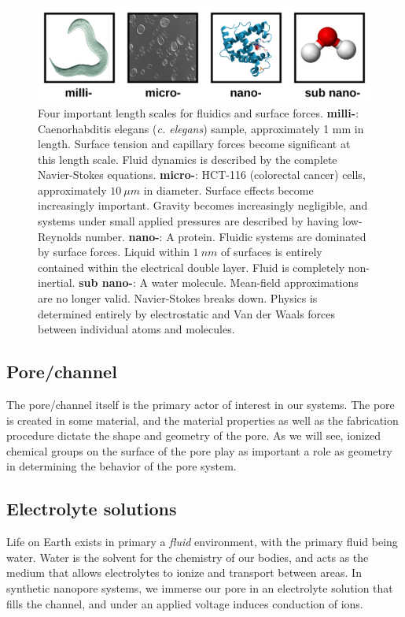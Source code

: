 		\begin{figure}[h]
			\includegraphics[width=\textwidth]{scales.png}
			\caption{Four important length scales for fluidics and surface forces. \textbf{milli-}: Caenorhabditis elegans (\textit{c. elegans}) sample, approximately 1 mm in length. Surface tension and capillary forces become significant at this length scale. Fluid dynamics is described by the complete Navier-Stokes equations. \textbf{micro-}: HCT-116 (colorectal cancer) cells, approximately $\SI{10}{\mu m}$ in diameter. Surface effects become increasingly important. Gravity becomes increasingly negligible, and systems under small applied pressures are described by having low-Reynolds number. \textbf{nano-}: A protein. Fluidic systems are dominated by surface forces. Liquid within $\SI{1}{nm}$ of surfaces is entirely contained within the electrical double layer. Fluid is completely non-inertial. \textbf{sub nano-}: A water molecule. Mean-field approximations are no longer valid. Navier-Stokes breaks down. Physics is determined entirely by electrostatic and Van der Waals forces between individual atoms and molecules.}
		\end{figure}
		
		\subsection{Pore/channel}
		
			The pore/channel itself is the primary actor of interest in our systems. The pore is created in some material, and the material properties as well as the fabrication procedure dictate the shape and geometry of the pore. As we will see, ionized chemical groups on the surface of the pore play as important a role as geometry in determining the behavior of the pore system.
		
		\subsection{Electrolyte solutions}
		
			Life on Earth exists in primary a \textit{fluid} environment, with the primary fluid being water. Water is the solvent for the chemistry of our bodies, and acts as the medium that allows electrolytes to ionize and transport between areas. In synthetic nanopore systems, we immerse our pore in an electrolyte solution that fills the channel, and under an applied voltage induces conduction of ions.
			
